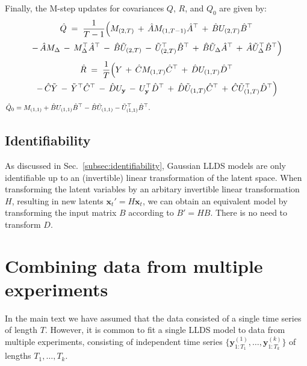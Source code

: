 \documentclass[10pt]{article}
\newcommand{\vx}{\mathbf{x}}
\newcommand{\vy}{\mathbf{y}}
\begin{document}
\begin{appendices}
Finally, the M-step updates for covariances $Q$, $R$, and $Q_0$ are
given by:
\begin{multline}
  \label{eq:QRwinput}
  \hat Q \; =\; \frac{1}{T-1} \Big(  M_{(2,T)} \,+\, \hat A  M_{(1,T-1)}\hat A^\top \,+\,
  \hat B U_{(2,T)}\hat B^\top    \\
\,-\,  \hat A  M_\Delta  \,-\, M_\Delta ^\top \hat A^\top
  \,-\, \hat B \tilde U_{(2,T)} \,-\, \tilde U_{(2,T)}^\top \hat B^\top
  \,+\, \hat B  \tilde U_{\Delta} \hat A^\top \,+\, \hat A \tilde U_{\Delta}^\top \hat B^\top
  \Big)
\end{multline}
\begin{multline}
  \hat R \;=\; \frac{1}{T} \Big(  Y \,+\,  \hat C  M_{(1,T)}\hat C\trp \,+\, \hat D
  U_{(1,T)} \hat D\trp
    \\
  \,-\,  \hat C \tilde Y  \,-\, \tilde Y\trp \hat C\trp
  \,-\,  \hat D U_{\vy} \,-\, U_{\vy}\trp \hat D\trp 
 \,+\,  \hat D \tilde U_{(1,T)} \hat C\trp \,+\,  \hat C \tilde U_{(1,T)}\trp \hat D\trp
 \Big)
\end{multline}
\begin{equation}
  \label{eq:mstepq0winput}
  \hat Q_0 = M_{(1,1)} +\hat B U_{(1,1)} \hat B\trp - \hat B \tilde U_{(1,1)} - \tilde
  U_{(1,1)}\trp \hat B\trp. \hspace{3.15in}
\end{equation}

\subsection{Identifiability}

As discussed in Sec.~\ref{subsec:identifiability}, Gaussian LLDS
models are only identifiable up to an (invertible) linear
transformation of the latent space.  When transforming the latent
variables by an arbitary invertible linear transformation $H$,
resulting in new latents $\vx_t' = H \vx_t$, we can obtain an
equivalent model by transforming the input matrix $B$ according to
$B' = H B$.  There is no need to transform $D$.


\section{Combining data from multiple experiments}
\label{asec:multi}

In the main text we have assumed that the data consisted of a single
time series of length $T$.  However, it is common to fit a single LLDS
model to data from multiple experiments, consisting of independent
time series $\{\vy^{(1)}_{1:T_1}, \ldots,
\vy^{(k)}_{1:T_k}\}$ of lengths $T_1, \ldots, T_k$.


\end{appendices}
\end{document}
